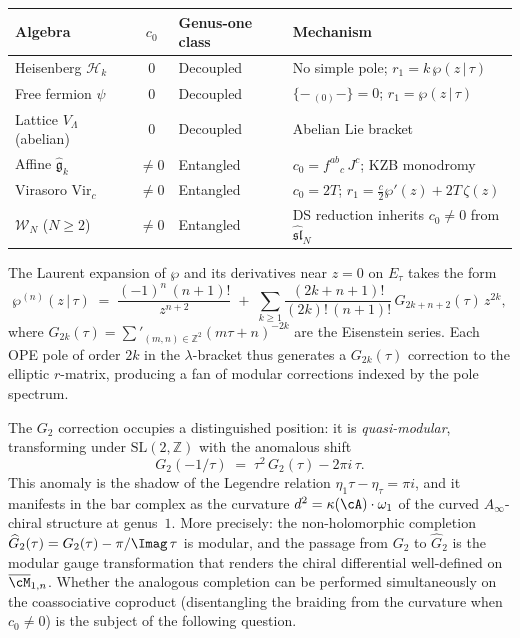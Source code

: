 \begin{center}
\begin{tabular}{l@{\quad}c@{\quad}l@{\quad}l}
\toprule
\textbf{Algebra} & $c_0$ & \textbf{Genus-one class} & \textbf{Mechanism} \\
\midrule
Heisenberg $\mathcal{H}_k$ & $0$ & Decoupled &
 No simple pole; $r_1=k\,\wp(z\,|\,\tau)$ \\
Free fermion $\psi$ & $0$ & Decoupled &
 $\{-\,{}_{(0)}-\}=0$; $r_1=\wp(z\,|\,\tau)$ \\
Lattice $V_\Lambda$ (abelian) & $0$ & Decoupled &
 Abelian Lie bracket \\[4pt]
Affine $\widehat{\mathfrak{g}}_k$ & $\ne 0$ & Entangled &
 $c_0=f^{ab}{}_c\,J^c$; KZB monodromy \\
Virasoro $\mathrm{Vir}_c$ & $\ne 0$ & Entangled &
 $c_0=2T$; $r_1=\tfrac{c}{2}\wp'(z)+2T\,\zeta(z)$ \\
$\mathcal{W}_N$ ($N\ge 2$) & $\ne 0$ & Entangled &
 DS reduction inherits $c_0\ne 0$ from $\widehat{\mathfrak{sl}}_N$ \\
\bottomrule
\end{tabular}
\end{center}

\begin{remark}
\label{rem:eisenstein-fan}
The Laurent expansion of $\wp$ and its derivatives
near $z=0$ on $E_\tau$ takes the form
\[
\wp^{(n)}(z\,|\,\tau)
\;=\;
\frac{(-1)^n\,(n+1)!}{z^{n+2}}
\;+\;
\sum_{k\ge 1}
 \frac{(2k+n+1)!}{(2k)!\,(n+1)!}\,
 G_{2k+n+2}(\tau)\,z^{2k},
\]
where $G_{2k}(\tau)=\sum'_{(m,n)\in\mathbb{Z}^2}(m\tau+n)^{-2k}$
are the Eisenstein series. Each OPE pole of order $2k$
in the $\lambda$-bracket thus generates a $G_{2k}(\tau)$
correction to the elliptic $r$-matrix, producing a fan of
modular corrections indexed by the pole spectrum.

The $G_2$ correction occupies a distinguished position:
it is \emph{quasi-modular}, transforming under
$\mathrm{SL}(2,\mathbb{Z})$ with the anomalous shift
\[
G_2(-1/\tau) \;=\; \tau^2\,G_2(\tau)-2\pi i\,\tau.
\]
This anomaly is the shadow of the Legendre relation
$\eta_1\tau-\eta_\tau=\pi i$, and it manifests in the
bar complex as the curvature $d^2=\kappa(\cA)\cdot\omega_1$
of the curved $A_\infty$-chiral structure at genus~$1$. More
precisely: the non-holomorphic completion
$\widehat{G}_2(\tau)=G_2(\tau)-\pi/\Imag\,\tau$
is modular, and the passage from $G_2$ to $\widehat{G}_2$
is the modular gauge transformation that renders the chiral
differential well-defined on $\overline{\cM}_{1,n}$. Whether
the analogous completion can be performed simultaneously
on the coassociative coproduct (disentangling the braiding
from the curvature when $c_0\ne 0$) is the subject
of the following question.
\end{remark}

